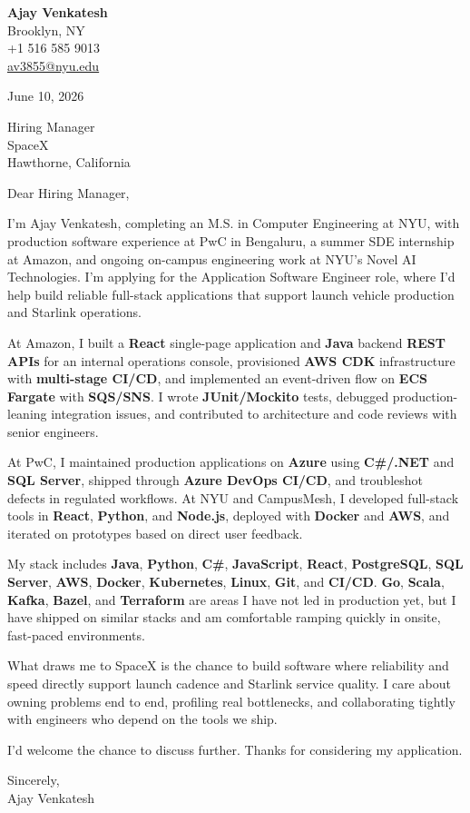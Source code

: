 \documentclass[letterpaper,11pt]{article}
\begin{document}
\begin{flushleft}
\textbf{\large Ajay Venkatesh} \\
Brooklyn, NY \\
+1 516 585 9013 \\
\href{mailto:av3855@nyu.edu}{av3855@nyu.edu}
\end{flushleft}
\vspace{10pt}
June 10, 2026
\vspace{6pt}

Hiring Manager \\
SpaceX \\
Hawthorne, California

\vspace{10pt}

Dear Hiring Manager,

I'm Ajay Venkatesh, completing an M.S. in Computer Engineering at NYU, with production software experience at PwC in Bengaluru, a summer SDE internship at Amazon, and ongoing on-campus engineering work at NYU's Novel AI Technologies. I'm applying for the Application Software Engineer role, where I'd help build reliable full-stack applications that support launch vehicle production and Starlink operations.

At Amazon, I built a \textbf{React} single-page application and \textbf{Java} backend \textbf{REST APIs} for an internal operations console, provisioned \textbf{AWS CDK} infrastructure with \textbf{multi-stage CI/CD}, and implemented an event-driven flow on \textbf{ECS Fargate} with \textbf{SQS/SNS}. I wrote \textbf{JUnit/Mockito} tests, debugged production-leaning integration issues, and contributed to architecture and code reviews with senior engineers.

At PwC, I maintained production applications on \textbf{Azure} using \textbf{C\#/.NET} and \textbf{SQL Server}, shipped through \textbf{Azure DevOps CI/CD}, and troubleshot defects in regulated workflows. At NYU and CampusMesh, I developed full-stack tools in \textbf{React}, \textbf{Python}, and \textbf{Node.js}, deployed with \textbf{Docker} and \textbf{AWS}, and iterated on prototypes based on direct user feedback.

My stack includes \textbf{Java}, \textbf{Python}, \textbf{C\#}, \textbf{JavaScript}, \textbf{React}, \textbf{PostgreSQL}, \textbf{SQL Server}, \textbf{AWS}, \textbf{Docker}, \textbf{Kubernetes}, \textbf{Linux}, \textbf{Git}, and \textbf{CI/CD}. \textbf{Go}, \textbf{Scala}, \textbf{Kafka}, \textbf{Bazel}, and \textbf{Terraform} are areas I have not led in production yet, but I have shipped on similar stacks and am comfortable ramping quickly in onsite, fast-paced environments.

What draws me to SpaceX is the chance to build software where reliability and speed directly support launch cadence and Starlink service quality. I care about owning problems end to end, profiling real bottlenecks, and collaborating tightly with engineers who depend on the tools we ship.

I'd welcome the chance to discuss further. Thanks for considering my application.

\vspace{12pt}
Sincerely, \\
Ajay Venkatesh
\end{document}
